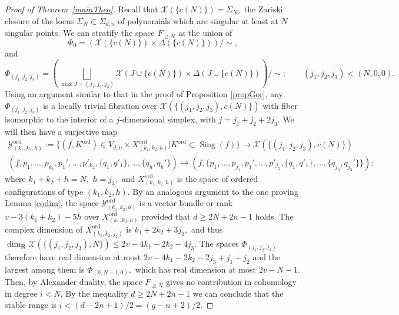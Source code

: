 \documentclass[10pt,a4paper,twoside]{amsart}
\theoremstyle{plain}
\theoremstyle{definition}
\theoremstyle{remark}
\begin{document}
\begin{proof}[Proof of Theorem~\ref{mainTheo}]
Recall that $\mathcal{X}(\{c(N)\})=\overline{\Sigma}_{N},$ the Zariski closure of the locus $\Sigma_{N}\subset\Sigma_{d,n}$ of polynomials which are singular at least at $N$ singular points. 
We can stratify the space $F_{\geq N}$ as the union of 
$$\Phi_0=\left(\mathcal{X}(\{c(N)\})\times\Delta(\{c(N)\})\right)/\sim,$$ 
and
$$\Phi_{(j_1,j_2,j_3)}=\left(\bigsqcup_{\operatorname{max}J=(j_1,j_2,j_3)}\mathcal{X}(J\cup\{c(N)\})\times\Delta(J\cup\{c(N)\})\right)/\sim;\qquad (j_1,j_2,j_3)< (N,0,0).$$
Using an argument similar to that in the proof of Proposition \ref{propGor}, any $\Phi_{(j_1,j_2,j_3)}$ is a locally trivial fibration over $\mathcal{X}(\{(j_1,j_2,j_3),c(N)\})$ with fiber isomorphic to the interior of a $j\mbox{-}$dimensional simplex, with $j=j_1+j_2+2j_3.$
We will then have a surjective map 
\begin{multline*}
    {\mathcal{Y}}^{\operatorname{ord}}_{(k_1,k_2,h)}:=\{(f,{K}^{\operatorname{ord}})\in V_{d,n}\times {X}^{\operatorname{ord}}_{(k_1,k_2,h)}|{K}^{\operatorname{ord}}\subset\operatorname{Sing}(f)\}\rightarrow \mathcal{X}(\{(j_1,j_2,j_3),c(N)\})\\
    (f,p_1,\dots,p_{k_1},p_1',\dots,p'_{k_2},\{q_1,q'_1\},\dots,\{q_h,q_h'\}) \mapsto (f,\{p_1,\dots,p_{j_1},p_1',\dots,p'_{j_2},\{q_1,q'_1\},\dots,\{q_{j_3},q_{j_3}'\}\});
\end{multline*}
where $k_1+k_2+h=N,$ $h=j_3,$ and ${X}^{\operatorname{ord}}_{(k_1,k_2,h)}$ is the space of ordered configurations of type $(k_1,k_2,h).$
By an analogous argument to the one proving Lemma \ref{codim}, the space ${\mathcal{Y}}^{\operatorname{ord}}_{(k_1,k_2,h)}$ is a vector bundle or rank $v-3(k_1+k_2)-5h$ over $X_{(k_1,k_2,h)}^{\operatorname{ord}}$ provided that $d\geq2N+2n-1$ holds.
The complex dimension of $X_{(k_1,k_2,j_3)}^{\operatorname{ord}}$ is $k_1+2k_2+3j_3,$ and thus $\operatorname{dim}_{\mathbf{R}}\mathcal{X}(\{(j_1,j_2,j_3),N\})\leq 2v-4k_1-2k_2-4j_3$. The spaces $\Phi_{(j_1,j_2,j_3)}$ therefore have real dimension at most $2v-4k_1-2k_2-2j_3+j_1+j_2$ and the largest among them is $\Phi_{(0,N-1,0)},$ which has real dimension at most $2v-N-1$. 
Then, by Alexander duality, the space $F_{\geq N}$ gives no contribution in cohomology in degree $i<N$. By the inequality $d\geq2N+2n-1$ we can conclude that the stable range is $i<{(d-2n+1)}/{2}=(g-n+2)/2.$
\end{proof}
\end{document}
